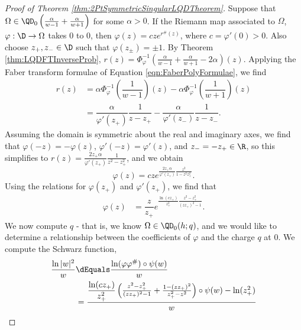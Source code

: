 \documentclass{article}
\numberwithin{equation}{section}
\begin{document}
\begin{proof}[Proof of Theorem \ref{thm:2PtSymmetricSingularLQDTheorem}]
Suppose that $\Omega\in\QD_0\left(\frac{\alpha}{w-1}+\frac{\alpha}{w+1}\right)$ for some $\alpha>0$. If the Riemann map associated to $\Omega$, $\varphi:\D\rightarrow\Omega$ takes $0$ to $0$, then $\varphi(z)=cze^{r^{\#}(z)}$, where $c=\varphi'(0)>0$. Also choose $z_+,z_-\in\D$ such that $\varphi(z_{\pm})=\pm1$. By Theorem \ref{thm:LQDFTInverseProb}, $r(z)=\Phi_{\varphi}^{-1}\left(\frac{\alpha}{w-1}+\frac{\alpha}{w+1}-2\alpha\right)(z)$. Applying the Faber transform formulae of Equation \ref{eqn:FaberPolyFormulae}, we find
\begin{align*}
    r(z)&=\alpha\Phi_{\varphi}^{-1}\left(\dfrac{1}{w-1}\right)(z)-\alpha\Phi_{\varphi}^{-1}\left(\dfrac{1}{w+1}\right)(z)\\
    &=\dfrac{\alpha}{\varphi'(z_{+})}\dfrac{1}{z-z_{+}}-\dfrac{\alpha}{\varphi'(z_{-})}\dfrac{1}{z-z_{-}}.
\end{align*}
Assuming the domain is symmetric about the real and imaginary axes, we find that $\varphi(-z)=-\varphi(z)$, $\varphi'(-z)=\varphi'(z)$, and $z_{-}=-z_{+}\in\R$, so this simplifies to $r(z)=\frac{2z_{+}\alpha}{\varphi'(z_{+})}\frac{1}{z^2-z_{+}^2}$, and we obtain
\begin{equation}\label{eqn:2PtSymmetricLQDFormula1}
    \varphi(z)=cze^{\frac{2z_{+}\alpha}{\varphi'(z_{+})}\frac{z^2}{1-z^2z_{+}^2}}.
\end{equation}
Using the relations for $\varphi(z_+)$ and $\varphi'(z_+)$, we find that
\begin{align*}
    \varphi(z)&=\dfrac{z}{z_{+}}e^{\frac{\ln(cz_{+})}{z_{+}^2}\frac{z^2-z_+^2}{(zz_+)^2-1}}.
\end{align*}
We now compute $q$ - that is, we know $\Omega\in\QD_0(h;q)$, and we would like to determine a relationship between the coefficients of $\varphi$ and the charge $q$ at $0$. We compute the Schwarz function,
\begin{align*}
    \dfrac{\ln|w|^2}{w}&\dEquals\dfrac{\ln(\varphi\varphi^{\#})\circ\psi(w)}{w}\\
    &=\dfrac{\dfrac{\ln(cz_{+})}{z_+^2}\left(\frac{z^2-z_+^2}{(zz_+)^2-1}+\frac{1-(zz_+)^2}{z_+^2-z^2}\right)\circ\psi(w)-\ln(z_+^2)}{w}\\

\end{align*}
\end{proof}
\end{document}
